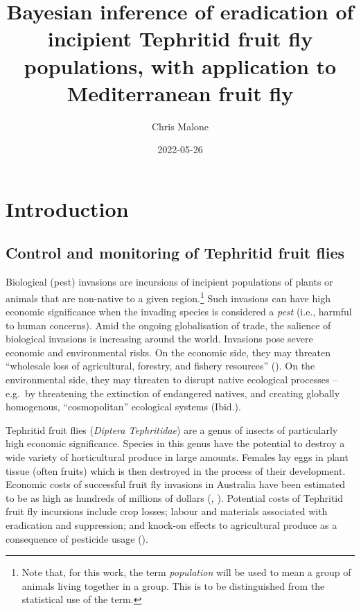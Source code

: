 \documentclass[
  oneside]{book}
\title{Bayesian inference of eradication of incipient Tephritid fruit fly populations, with application to Mediterranean fruit fly}
\author{Chris Malone}
\date{2022-05-26}
\begin{document}
\maketitle

\renewcommand{\baselinestretch}{1}\normalsize
\tableofcontents
\renewcommand{\baselinestretch}{2}\normalsize

\hypertarget{introduction}{%
\chapter{Introduction}\label{introduction}}

\hypertarget{control-and-monitoring-of-tephritid-fruit-flies}{%
\section{Control and monitoring of Tephritid fruit flies}\label{control-and-monitoring-of-tephritid-fruit-flies}}

Biological (pest) invasions are incursions of incipient populations of plants or animals that are non-native to a given region.\footnote{Note that, for this work, the term \emph{population} will be used to mean a group of animals living together in a group. This is to be distinguished from the statistical use of the term.} Such invasions can have high economic significance when the invading species is considered a \emph{pest} (i.e., harmful to human concerns). Amid the ongoing globalisation of trade, the salience of biological invasions is increasing around the world. Invasions pose severe economic and environmental risks. On the economic side, they may threaten ``wholesale loss of agricultural, forestry, and fishery resources'' (\citet{mack2000}). On the environmental side, they may threaten to disrupt native ecological processes -- e.g.~by threatening the extinction of endangered natives, and creating globally homogenous, ``cosmopolitan'' ecological systems (Ibid.).

Tephritid fruit flies (\emph{Diptera Tephritidae}) are a genus of insects of particularly high economic significance. Species in this genus have the potential to destroy a wide variety of horticultural produce in large amounts. Females lay eggs in plant tissue (often fruits) which is then destroyed in the process of their development. Economic costs of successful fruit fly invasions in Australia have been estimated to be as high as hundreds of millions of dollars (\citet{suckling2016}, \citet{hancock2000}). Potential costs of Tephritid fruit fly incursions include crop losses; labour and materials associated with eradication and suppression; and knock-on effects to agricultural produce as a consequence of pesticide usage (\citet{suckling2016}).
\end{document}
